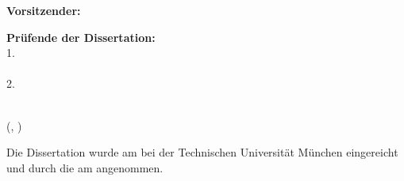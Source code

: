 \begin{titlepage}
\begin{textblock*}{}
        \textbf{Vorsitzender:}\\
        \hspace{8mm}\hphantom{1. } \chairman{}

        \vspace{2mm}

        \textbf{Pr\"ufende der Dissertation:}\\
        \hspace{8mm}1. \supervisorA{}\\
          \hspace{8mm}\hphantom{2. }\supervisorAuni{}\\
        \hspace{8mm}2. \supervisorB{}\\
          \hspace{8mm}\hphantom{2. }\supervisorBuni{}\\
%


    \end{textblock*}



    \begin{textblock*}{}(, \datevpos)
        \raggedright

        Die Dissertation wurde am \subdate{} bei der Technischen Universit\"at
        M\"unchen eingereicht und durch die {\facultyger{}}
          am \accdate{}
        angenommen.

    \end{textblock*}

\end{titlepage}

\mbox{}
\newpage
\thispagestyle{empty}
\mbox{}
\newpage

\thispagestyle{empty}

%
%
